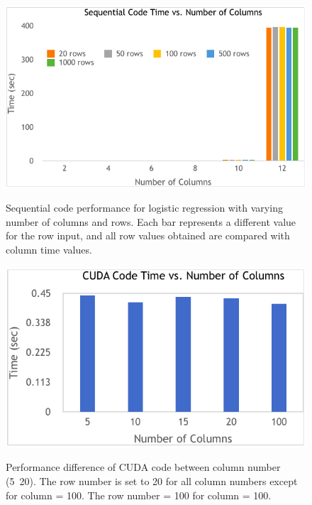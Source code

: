 \documentclass[letterpaper, 10 pt, conference]{ieeeconf}  %
\begin{document}
   \begin{figure}[thpb]
      \centering
  		\includegraphics[width=\linewidth]{seqcode2.png}
  		\label{fig:seq1}
  		\caption{Sequential code performance for logistic regression with varying number of columns and rows. Each bar represents a different value for the row input, and all row values obtained are compared with column time values.}
   \end{figure}

	\begin{figure}[thpb]
		\centering
		\includegraphics[width=\linewidth]{cudacolumns.png}
		\label{fig:cudacol}
		\caption{Performance difference of CUDA code between column number (5~20). The row number is set to 20 for all column numbers except for column = 100. The row number = 100 for column = 100.}
	\end{figure}
\end{document}
